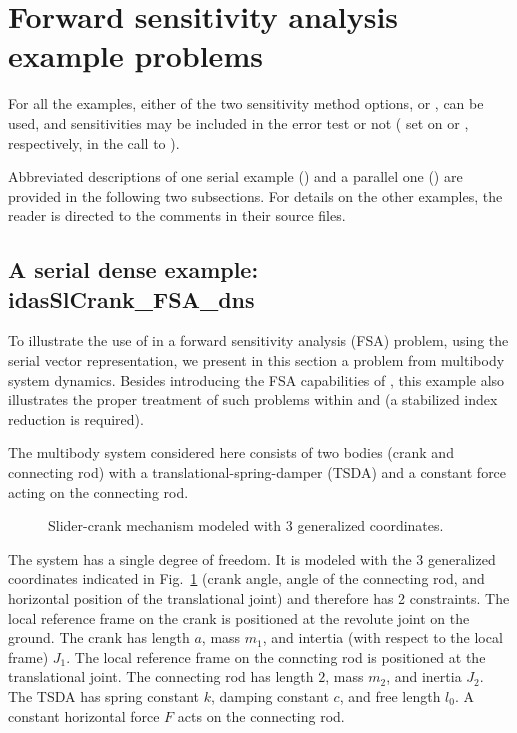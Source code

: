 \section{Forward sensitivity analysis example problems}\label{s:fwd_ex}

For all the {\idas} examples, either of the two sensitivity method options,
 or , can be used, 
and sensitivities may be included in the error test or not 
( set on  or , respectively, in the
call to ).

Abbreviated descriptions of one serial example ()
and a parallel one () are provided in the following
two subsections.  For details on the other examples, the reader is
directed to the comments in their source files.



\subsection{A serial dense example: idasSlCrank\_FSA\_dns}
\label{ss:idasSlCrank_FSA_dns}
To illustrate the use of {\idas} in a forward sensitivity analysis (FSA) problem, using
the serial vector representation, we present in this section a problem from
multibody system dynamics. Besides introducing the FSA capabilities of {\idas},
this example also illustrates the proper treatment of such problems within {\ida} and {\idas}
(a stabilized index reduction is required). 

The multibody system considered here consists of two bodies (crank and connecting rod) with 
a translational-spring-damper (TSDA) and a constant force acting on the connecting rod. 
\begin{figure}
  {\centerline{}}
  \caption{Slider-crank mechanism modeled with 3 generalized coordinates.}
  \label{f:sl_crank}
\end{figure}
The system has a single degree of freedom. It is modeled with the 3 generalized coordinates
indicated in Fig.~\ref{f:sl_crank} (crank angle, angle of the connecting rod, and horizontal
position of the translational joint) and therefore has 2 constraints.
The local reference frame on the crank is positioned at the revolute joint on the ground. 
The crank has length $a$, mass $m_1$, and intertia (with respect to the local frame) $J_1$.
The local reference frame on the conncting rod is positioned at the translational joint. 
The connecting rod has length $2$, mass $m_2$, and inertia $J_2$.
The TSDA has spring constant $k$, damping constant $c$, and free length $l_0$.
A constant horizontal force $F$ acts on the connecting rod.

